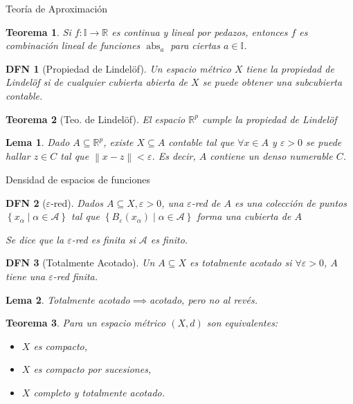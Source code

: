 \documentclass[a4paper]{article}\usepackage{/home/alonso/Documents/Projects/formularios/styles}
\newtheorem{definition}{DFN}
\theoremstyle{mytheoremstyle}
\newtheorem{theorem}{Teorema}
\newtheorem{lemma}{Lema}
\newcommand{\R}{\mathbb{R}}
\newcommand{\I}{\mathbb{I}}
\newcommand{\1}{\mathds{1}}
\newcommand{\norm}[1]{\left\|#1\right\|}
\DeclareMathOperator{\abs}{abs}
\begin{document}
\begin{multicols*}{3}
\begin{roundbox}{Teoría de Aproximación}
\begin{theorem}
Si $f:\I\to\R$ es continua y lineal por pedazos, entonces $f$ es combinación lineal de funciones $\abs_a$ para ciertas $a\in\I$.
\end{theorem}

\begin{definition}[Propiedad de Lindel\"of]
    Un espacio métrico $X$ tiene la propiedad de Lindel\"of si de cualquier cubierta abierta de $X$ se puede obtener una subcubierta contable.
\end{definition}

\begin{theorem}[Teo. de Lindel\"of]
    El espacio $\R^{p}$ cumple la propiedad de Lindel\"of
\end{theorem}

\begin{lemma}
    Dado $A \subseteq \R^{p}$, existe $X \subseteq A$ contable tal que $\forall x \in A$ y $\varepsilon >0$ se puede hallar $z \in C$ tal que $\norm{x-z} < \varepsilon$.
    Es decir, $A$ contiene un denso numerable $C$.
\end{lemma}
\end{roundbox}

\begin{roundbox}{Densidad de espacios de funciones}
\begin{definition}[$\varepsilon$-red]
    Dados $A \subseteq X, \varepsilon > 0$, una $\varepsilon$-red de $A$ es una colección de puntos $\left\{ x_{\alpha} \mid \alpha \in \mathcal{A} \right\}$ tal que $\left\{ B_{\varepsilon}(x_{\alpha}) \mid \alpha \in \mathcal{A} \right\}$ forma una cubierta de $A$

    Se dice que la $\varepsilon$-red es finita si $\mathcal{A}$ es finito.
\end{definition}

\begin{definition}[Totalmente Acotado]
    Un $A \subseteq X$ es totalmente acotado si $\forall \varepsilon > 0$, $A$ tiene una $\varepsilon$-red finita.
\end{definition}

\begin{lemma}
    Totalmente acotado$\implies$acotado, pero no al revés.
\end{lemma}

\begin{theorem}
    Para un espacio métrico $(X,d)$ son equivalentes:
    \begin{itemize}
        \item $X$ es compacto,
        \item $X$ es compacto por sucesiones,
        \item $X$ completo y totalmente acotado.
    \end{itemize}
\end{theorem}
\end{roundbox}


\end{multicols*}
\end{document}
